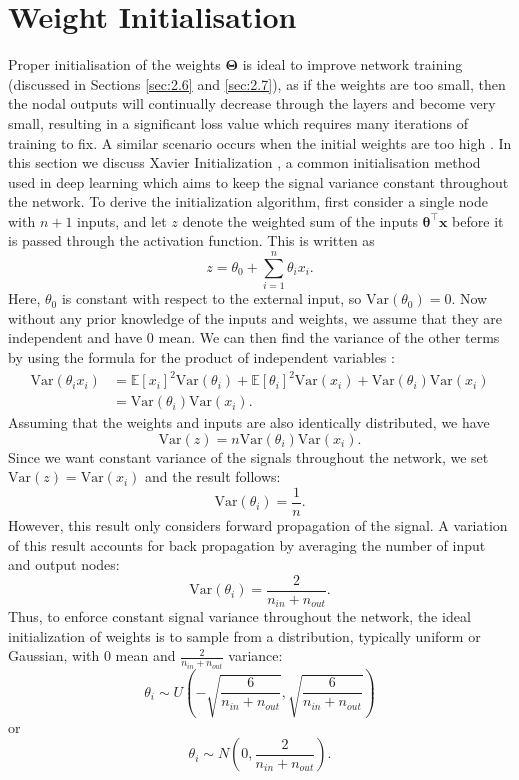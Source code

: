 \documentclass[honours,12pt]{unswthesis}
\newcommand{\E}{\mathbb{E}}
\newcommand{\Var}{\mathrm{Var}}
\numberwithin{equation}{section}
\theoremstyle{definition}
\begin{document}
\section{Weight Initialisation}\label{sec:2.5}
Proper initialisation of the weights $\bm{\Theta}$ is ideal to improve network training (discussed in Sections \ref{sec:2.6} and \ref{sec:2.7}), as if the weights are too small, then the nodal outputs will continually decrease through the layers and become very small, resulting in a significant loss value which requires many iterations of training to fix. A similar scenario occurs when the initial weights are too high \citep{bishop}. In this section we discuss Xavier Initialization \citep{xavier}, a common initialisation method used in deep learning which aims to keep the signal variance constant throughout the network. To derive the initialization algorithm, first consider a single node with $n+1$ inputs, and let $z$ denote the weighted sum of the inputs $\bm{\theta}^\top\bm{x}$ before it is passed through the activation function. This is written as
\[z=\theta_0+\sum^n_{i=1}\theta_ix_i.\]
Here, $\theta_0$ is constant with respect to the external input, so $\Var(\theta_0)=0$. Now without any prior knowledge of the inputs and weights, we assume that they are independent and have 0 mean. We can then find the variance of the other terms by using the formula for the product of independent variables \citep{goodman}:
\begin{align*}
\Var(\theta_ix_i)&=\E[x_i]^2\Var(\theta_i)+\E[\theta_i]^2\Var(x_i)+\Var(\theta_i)\Var(x_i)\\
&=\Var(\theta_i)\Var(x_i).
\end{align*}
Assuming that the weights and inputs are also identically distributed, we have
\[\Var(z)=n\Var(\theta_i)\Var(x_i).\]
Since we want constant variance of the signals throughout the network, we set $\Var(z)=\Var(x_i)$ and the result follows:
\[\Var(\theta_i)=\frac1n.\]
However, this result only considers forward propagation of the signal. A variation of this result accounts for back propagation by averaging the number of input and output nodes:
\[\Var(\theta_i)=\frac{2}{n_{in}+n_{out}}.\]
Thus, to enforce constant signal variance throughout the network, the ideal initialization of weights is to sample from a distribution, typically uniform or Gaussian, with $0$ mean and $\frac{2}{n_{in}+n_{out}}$ variance:
\[\theta_i\sim U\left(-\sqrt{\frac{6}{n_{in}+n_{out}}},\sqrt{\frac{6}{n_{in}+n_{out}}}\right)\]
or
\[\theta_i\sim N\left(0,\frac{2}{n_{in}+n_{out}}\right).\]
\end{document}
